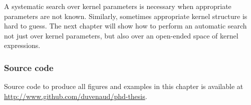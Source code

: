 
A systematic search over kernel parameters is necessary when appropriate parameters are not known.
Similarly, sometimes appropriate kernel structure is hard to guess.
The next chapter will show how to perform an automatic search not just over kernel parameters, but also over an open-ended space of kernel expressions.

\subsubsection{Source code}
Source code to produce all figures and examples in this chapter is available at \\\url{http://www.github.com/duvenaud/phd-thesis}.



